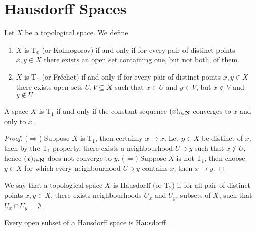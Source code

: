 \section{Hausdorff Spaces}

\begin{definition}
    Let \(X\) be a topological space. We define
    \begin{enumerate}[(1)]
        \item\label{def:T0-space-kolmogorov} \(X\) is T\(_0\) (or Kolmogorov) if and
        only if for every pair of distinct points \(x, y \in X\) there exists an open
        set containing one, but not both, of them.
        \item\label{def:T1-space-frechet} \(X\) is T\(_1\) (or Fréchet) if and only if
        for every pair of distinct points \(x, y \in X\) there exists open sets
        \(U, V \subseteq X\) such that \(x \in U\) and \(y \in V\), but
        \(x \not\in V\) and \(y \not\in U\)
    \end{enumerate}
\end{definition}

\begin{proposition}
    A space \(X\) is T\(_1\) if and only if the constant sequence \((x)_{i \in
            \mathbf{N}}\) converges to \(x\) and only to \(x\).
\end{proposition}

\begin{proof}
    (\(\Rightarrow\)) Suppose \(X\) is T\(_1\), then certainly \(x \to x\). Let
    \(y \in X\) be distinct of \(x\), then by the T\(_1\) property, there exists a
    neighbourhood \(U \ni y\) such that \(x \not\in U\), hence \((x)_{i \in
            \mathbf{N}}\) does not converge to \(y\). (\(\Leftarrow\)) Suppose \(X\) is
    not T\(_1\), then choose \(y \in X\) for which every neighbourhood \(U \ni y\)
    contains \(x\), then \(x \to y\).
\end{proof}

\begin{definition}\label{def: Hausdorff space}
    We say that a topological space \(X\) is Hausdorff (or T\(_2\)) if for all
    pair of distinct points \(x, y \in X\), there exists neighbourhoods \(U_x\)
    and \(U_y\), subsets of \(X\), such that \(U_x \cap U_y = \emptyset\).
\end{definition}

\begin{corollary}
    Every open subset of a Hausdorff space is Hausdorff.
\end{corollary}

